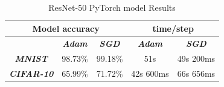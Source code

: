 \documentclass[conference]{IEEEtran}
\begin{document}
\begin{table}[!htbp]
    \caption{ResNet-50 PyTorch model Results}
    \begin{center}
    \begin{tabular}{|c|c|c|c|c|}
    \cline{1-5} 
    \multicolumn{3}{|c|}{\textbf{Model accuracy}} & \multicolumn{2}{|c|}{\textbf{time/step}} \\
    \hline 
    \textit{} & \textbf{\textit{Adam}} & \textbf{\textit{SGD}} & \textbf{\textit{Adam}} & \textbf{\textit{SGD}} \\
    \hline
    \textbf{\textit{MNIST}} & 98.73\% & 99.18\% & 51s & 49s 200ms  \\
    \hline
    \textbf{\textit{CIFAR-10}} & 65.99\% & 71.72\% & 42s 600ms & 66s 656ms \\
    \cline{1-5} 
    \end{tabular}
    \label{tab: ResNet-50 model accuracy}
    \end{center}
\end{table}
\end{document}
